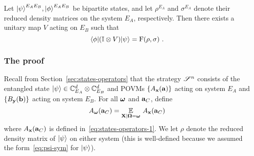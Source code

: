 \begin{theorem}
\label{thm:uhlmann}
	Let ${|\psi\rangle}^{E_A E_B},{|\phi\rangle}^{E_A E_B}$ be bipartite states, and let $\rho^{E_A}$ and $\sigma^{E_A}$ denote their reduced density matrices on the system $E_A$, respectively. Then there exists a unitary map $V$ acting on $E_B$ such that
	\[
		{\langle\phi|} (\mathbb{I} \otimes V) {|\psi\rangle} = \mathrm{F}(\rho,\sigma)~.
	\]
\end{theorem}



\subsubsection{The proof}

Recall from Section~\ref{sec:states-operators} that the strategy $\mathscr{S}^n$ consists of the entangled state ${|\psi\rangle} \in \mathbb{C}^d_{E_A} \otimes \mathbb{C}^d_{E_B}$ and POVMs $\{A_{\mathbf{x}}(\mathbf{a}) \}$ acting on system $E_A$ and $\{B_{\mathbf{y}}(\mathbf{b}) \}$ acting on system $E_B$. For all ${\boldsymbol{\omega}}$ and $\mathbf{a}_C$, define
\[
	A_{\boldsymbol{\omega}}(\mathbf{a}_C) = \operatorname*{\mathbb{E}}_{\mathbf{X} | {\boldsymbol{\Omega}} = {\boldsymbol{\omega}}} \, A_{\mathbf{x}}(\mathbf{a}_C)
\]
where $A_{\mathbf{x}}(\mathbf{a}_C)$ is defined in~\ref{eq:states-operators-1}. 
We let $\rho$ denote the reduced density matrix of ${|\psi\rangle}$ on either system (this is well-defined because we assumed the form~\eqref{eq:psi-sym} for ${|\psi\rangle}$). 

